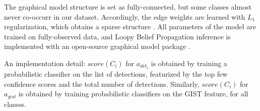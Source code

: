 The graphical model structure is set as fully-connected, but some classes almost never co-occurr in our dataset.
Accordingly, the edge weights are learned with $L_1$ regularization, which obtains a sparse structure \cite{Lee2006}.
All parameters of the model are trained on fully-observed data, and Loopy Belief Propagation inference is implemented with an open-source graphical model package \cite{Jaimovich2010}.

An implementation detail: $score(C_i)$ for $a_{{det}_i}$ is obtained by training a probabilistic classifier on the list of detections, featurized by the top few confidence scores and the total number of detections.
Similarly, $score(C_i)$ for $a_{gist}$ is obtained by training probabilistic classifiers on the GIST feature, for all classes.
